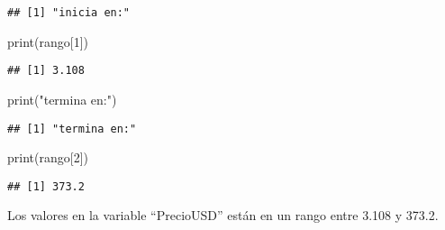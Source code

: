 \documentclass[
]{article}
\newenvironment{Shaded}{\begin{snugshade}}{\end{snugshade}}
\newcommand{\AttributeTok}[1]{\textcolor[rgb]{0.77,0.63,0.00}{#1}}
\newcommand{\DecValTok}[1]{\textcolor[rgb]{0.00,0.00,0.81}{#1}}
\newcommand{\FunctionTok}[1]{\textcolor[rgb]{0.00,0.00,0.00}{#1}}
\newcommand{\NormalTok}[1]{#1}
\newcommand{\OtherTok}[1]{\textcolor[rgb]{0.56,0.35,0.01}{#1}}
\newcommand{\SpecialCharTok}[1]{\textcolor[rgb]{0.00,0.00,0.00}{#1}}
\newcommand{\StringTok}[1]{\textcolor[rgb]{0.31,0.60,0.02}{#1}}
\begin{document}
\begin{Shaded}
\end{Shaded}

\begin{verbatim}
## [1] "inicia en:"
\end{verbatim}

\begin{Shaded}
\begin{Highlighting}[]
\FunctionTok{print}\NormalTok{(rango[}\DecValTok{1}\NormalTok{])}
\end{Highlighting}
\end{Shaded}

\begin{verbatim}
## [1] 3.108
\end{verbatim}

\begin{Shaded}
\begin{Highlighting}[]
\FunctionTok{print}\NormalTok{(}\StringTok{"termina en:"}\NormalTok{)}
\end{Highlighting}
\end{Shaded}

\begin{verbatim}
## [1] "termina en:"
\end{verbatim}

\begin{Shaded}
\begin{Highlighting}[]
\FunctionTok{print}\NormalTok{(rango[}\DecValTok{2}\NormalTok{])}
\end{Highlighting}
\end{Shaded}

\begin{verbatim}
## [1] 373.2
\end{verbatim}

Los valores en la variable ``PrecioUSD'' están en un rango entre 3.108 y
373.2.

\begin{Shaded}
\end{Shaded}
\end{document}
